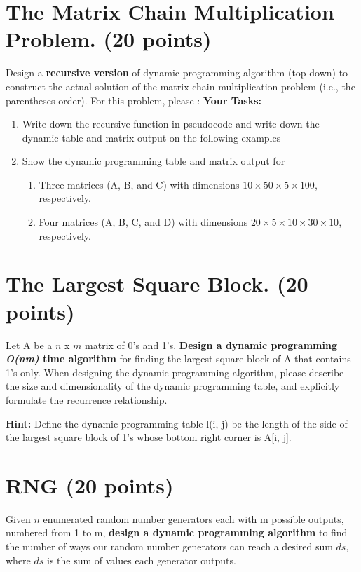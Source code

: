 \documentclass{article}[12pt]
\begin{document}
\newpage
\section{The Matrix Chain Multiplication Problem. (20 points)}
Design a \textbf{recursive version} of dynamic programming algorithm (top-down) to construct the actual solution of the matrix chain multiplication problem (i.e., the parentheses order). For this problem, please :
\noindent\textbf{Your Tasks:}
\begin{enumerate}
\item Write down the recursive function in pseudocode and write down the dynamic table and matrix output on the following examples
\item Show the dynamic programming table and matrix output for 
    \begin{enumerate}
        \item  Three matrices (A, B, and C) with dimensions $10 \times 50 \times 5 \times 100$, respectively.
        \item Four matrices (A, B, C, and D) with dimensions $20 \times 5 \times 10 \times 30 \times 10$, respectively.
    \end{enumerate}

\end{enumerate}

\section{The Largest Square Block. (20 points)}
Let A be a $n$ x $m$ matrix of 0's and 1's. \textbf{Design a dynamic programming \textit{O(nm)} time algorithm} for finding the largest square block of A that contains 1's only. When designing the dynamic programming algorithm, please describe the size and dimensionality of the dynamic programming table, and explicitly formulate the recurrence relationship. 

\noindent\textbf{Hint:} Define the dynamic programming table l(i, j) be the length of the side of the largest square block of 1's whose bottom right corner is A[i, j].


\section{RNG (20 points) }

Given $n$ enumerated random number generators each with m possible outputs, numbered from 1 to m, \textbf{design a dynamic programming algorithm} to find the number of ways our random number generators can reach a desired sum $ds$, where $ds$ is the sum of values each generator outputs.
\end{document}
